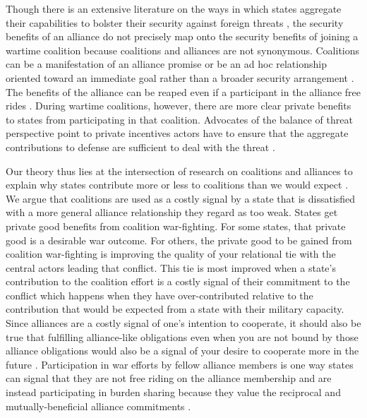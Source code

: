 \documentclass[12pt,letterpaper]{article}
\begin{document}
	Though there is an extensive literature on the ways in which states aggregate their capabilities to bolster their security against foreign threats \citep{waltz_theoryinternationalpolitics_1979}, the security benefits of an alliance do not precisely map onto the security benefits of joining a wartime coalition because coalitions and alliances are not synonymous. Coalitions can be a manifestation of an alliance promise or be an ad hoc relationship oriented toward an immediate goal rather than a broader security arrangement \citep[115]{weitsman_wartimealliancescoalition_2010}. The benefits of the alliance can be reaped even if a participant in the alliance free rides \citep{olson_economictheoryalliances_1966}. During wartime coalitions, however, there are more clear private benefits to states from participating in that coalition. Advocates of the balance of threat perspective point to private incentives actors have to ensure that the aggregate contributions to defense are sufficient to deal with the threat \citep{bennett_friendsneedburden_1997, baltrusaitis_coalitionpoliticsiraq_2010, davidson_neoclassicalrealistexplanation_2011}.
	
	Our theory thus lies at the intersection of research on coalitions and alliances to explain why states contribute more or less to coalitions than we would expect \citep{saideman_ambivalentcoalitiondoing_2016}. We argue that coalitions are used as a costly signal by a state that is dissatisfied with a more general alliance relationship they regard as too weak. States get private good benefits from coalition war-fighting. For some states, that private good is a desirable war outcome. For others, the private good to be gained from coalition war-fighting is improving the quality of your relational tie with the central actors leading that conflict. This tie is most improved when a state's contribution to the coalition effort is a costly signal of their commitment to the conflict which happens when they have over-contributed relative to the contribution that would be expected from a state with their military capacity. Since alliances are a costly signal of one's intention to cooperate, it should also be true that fulfilling alliance-like obligations even when you are not bound by those alliance obligations would also be a signal of your desire to cooperate more in the future \citep[704]{warren_geometrysecuritymodeling_2010}. Participation in war efforts by fellow alliance members is one way states can signal that they are not free riding on the alliance membership and are instead participating in burden sharing because they value the reciprocal and mutually-beneficial alliance commitments \citep[225-227]{maskaliunaite_sharingburdenassessing_2014}.
	
\end{document}
